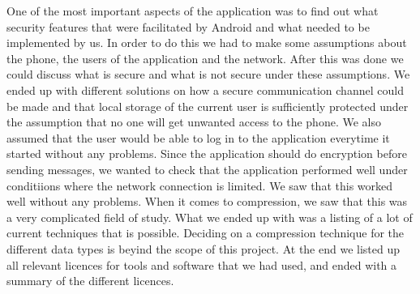 \newline\newline
One of the most important aspects of the application was to find out what security features that were facilitated by Android and what needed to be implemented by us. In order to do this we had to make some assumptions about the phone, the users of the application and the network. After this was done we could discuss what is secure and what is not secure under these assumptions. We ended up with different solutions on how a secure communication channel could be made and that local storage of the current user is sufficiently protected under the assumption that no one will get unwanted access to the phone. We also assumed that the user would be able to log in to the application everytime it started without any problems.
\newline\newline
Since the application should do encryption before sending messages, we wanted to check that the application performed well under conditiions where the network connection is limited. We saw that this worked well without any problems.
\newline
\newline
When it comes to compression, we saw that this was a very complicated field of study. What we ended up with was a listing of a lot of current techniques that is possible. Deciding on a compression technique for the different data types is beyind the scope of this project.
\newline\newline
At the end we listed up all relevant licences for tools and software that we had used, and ended with a summary of the different licences.